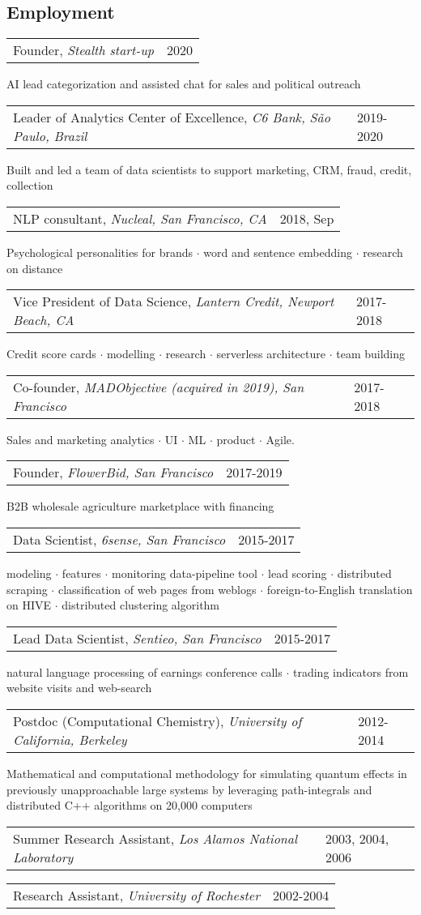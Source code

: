\documentclass{res}
\makeatletter
\newcommand{\af}[3]{
\begin{tabular*}{\textwidth}[t]{@{}p{5.2in} l} 
    #1, \textit{#2} & #3\\
  \end{tabular*}
}
\newcommand{\aff}[4]{
\begin{tabular*}{\textwidth}[t]{@{}p{5.2in} l} 
    #1, \textit{#2} & #3\\
  \end{tabular*}
  {\color[RGB]{106,106,106} #4}\\
}
\makeatother
\begin{document}
 


\address{
  1632 Walnut St.\\
  Berkeley, CA 94709 \\
}
\address{
  (585) 313-6024\\
  kirill.igum@gmail.com\\
  \url{www.linkedin.com/in/kirilligum}
}

\begin{resume}

\section{Employment}
\aff{
Founder}{Stealth start-up}{2020}{ 
	AI lead categorization and assisted chat for sales and political outreach
}
\aff{
Leader of Analytics Center of Excellence}{C6 Bank, S\~{a}o Paulo, Brazil}{2019-2020}{ 
	Built and led a team of data scientists to support marketing, CRM, fraud, credit, collection
}
\aff{NLP consultant}{Nucleal, San Francisco, CA}{2018, Sep}{ 
	Psychological personalities for brands $\cdot$ word and sentence embedding $\cdot$ research on distance
}
\aff{Vice President of Data Science}{Lantern Credit, Newport Beach, CA}{2017-2018}{ 
	Credit score cards $\cdot$ modelling $\cdot$ research $\cdot$ serverless architecture $\cdot$ team building
} 
\aff{Co-founder}{MADObjective (acquired in 2019), San Francisco}{2017-2018}{ 
	Sales and marketing analytics $\cdot$ UI $\cdot$ ML $\cdot$ product $\cdot$ Agile.
} 
\aff{Founder}{FlowerBid, San Francisco}{2017-2019}{ 
	B2B wholesale agriculture marketplace with financing 
} 
\aff{Data Scientist}{6sense, San Francisco}{2015-2017}{ 
	modeling $\cdot$ 
	features $\cdot$  
	monitoring data-pipeline tool $\cdot$ 
	lead scoring $\cdot$
	distributed scraping $\cdot$
	classification of web pages from weblogs $\cdot$
	foreign-to-English translation on HIVE $\cdot$
	distributed clustering algorithm
} 
\aff{Lead Data Scientist}{Sentieo, San Francisco}{2015-2017}{ 
	natural language processing of earnings conference calls $\cdot$ trading indicators from website visits and web-search
} 
\aff{Postdoc (Computational Chemistry)}{University of California, Berkeley}{2012-2014}{ 
  Mathematical and computational methodology for simulating quantum effects in previously unapproachable large systems by leveraging path-integrals and distributed C++ algorithms on 20,000 computers
} 
\af{Summer Research Assistant}{Los Alamos National Laboratory}{2003, 2004, 2006}
\af{Research Assistant}{University of Rochester}{2002-2004}
 

\end{resume}
\end{document}
